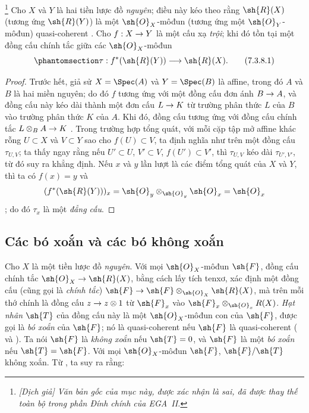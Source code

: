 \documentclass[oneside]{amsart}
\makeatletter
\newcommand{\ega@arrow}[2]{\mathchoice{#1}{#2}{#2}{#2}}
\renewcommand{\to}{\ega@arrow{\longrightarrow}{\rightarrow}}
\let\EGAOriginalLabel\label
\renewcommand{\label}[1]{\phantomsection\EGAOriginalLabel{#1}}
\makeatother
\begin{document}
\begin{env}[7.3.8]
\label{I.7.3.8}
\footnote{\emph{[Dịch giả] Văn bản gốc của mục này, được xác nhận là sai, đã được thay thế toàn bộ trong phần Đính chính của EGA~II.}}
Cho $X$ và $Y$ là hai tiền lược đồ \emph{nguyên}; điều này kéo theo rằng $\sh{R}(X)$ (tương ứng $\sh{R}(Y)$) là một $\sh{O}_X$-môđun (tương ứng một $\sh{O}_Y$-môđun) quasi-coherent .
Cho $f:X\to Y$ là một cấu xạ \emph{trội}; khi đó tồn tại một đồng cấu chính tắc giữa các $\sh{O}_X$-môđun
\[
\label{I.7.3.8.1}
  \tau:f^*(\sh{R}(Y))\to\sh{R}(X).
  \tag{7.3.8.1}
\]
\end{env}

\begin{proof}
Trước hết, giả sử $X=\Spec(A)$ và $Y=\Spec(B)$ là affine, trong đó $A$ và $B$ là hai miền nguyên; do đó $f$ tương ứng với một đồng cấu đơn ánh $B\to A$, và đồng cấu này kéo dài thành một đơn cấu $L\to K$ từ trường phân thức $L$ của $B$ vào trường phân thức $K$ của $A$.
Khi đó, đồng cấu  tương ứng với đồng cấu chính tắc $L\otimes_B A\to K$ .
Trong trường hợp tổng quát, với mỗi cặp tập mở affine khác rỗng $U\subset X$ và $V\subset Y$ sao cho $f(U)\subset V$, ta định nghĩa như trên một đồng cấu $\tau_{U,V}$; ta thấy ngay rằng nếu $U'\subset U$, $V'\subset V$, $f(U')\subset V'$, thì $\tau_{U,V}$ kéo dài $\tau_{U',V'}$, từ đó suy ra khẳng định.
Nếu $x$ và $y$ lần lượt là các điểm tổng quát của $X$ và $Y$, thì ta có $f(x)=y$ và
\[
  (f^*(\sh{R}(Y)))_x=\sh{O}_y\otimes_{\sh{O}_y}\sh{O}_x=\sh{O}_x
\]
; do đó $\tau_x$ là một \emph{đẳng cấu}.
\end{proof}

\subsection{Các bó xoắn và các bó không xoắn}
\label{subsection:I.7.4}
\label{I.7.4}

\begin{env}[7.4.1]
\label{I.7.4.1}
Cho $X$ là một tiền lược đồ \emph{nguyên}.
Với mọi $\sh{O}_X$-môđun $\sh{F}$, đồng cấu chính tắc $\sh{O}_X\to\sh{R}(X)$, bằng cách lấy tích tenxơ, xác định một đồng cấu (cũng gọi là \emph{chính tắc}) $\sh{F}\to\sh{F}\otimes_{\sh{O}_X}\sh{R}(X)$, mà trên mỗi thớ chính là đồng cấu $z\to z\otimes1$ từ $\sh{F}_x$ vào $\sh{F}_x\otimes_{\sh{O}_x}R(X)$.
\emph{Hạt nhân $\sh{T}$} của đồng cấu này là một $\sh{O}_X$-môđun con của $\sh{F}$, được gọi là \emph{bó xoắn} của $\sh{F}$; nó là quasi-coherent nếu $\sh{F}$ là quasi-coherent ( và ).
Ta nói $\sh{F}$ là \emph{không xoắn} nếu $\sh{T}=0$, và $\sh{F}$ là một \emph{bó xoắn} nếu $\sh{T}=\sh{F}$.
Với mọi $\sh{O}_X$-môđun $\sh{F}$, $\sh{F}/\sh{T}$ không xoắn.
Từ , ta suy ra rằng:
\end{env}
\end{document}
